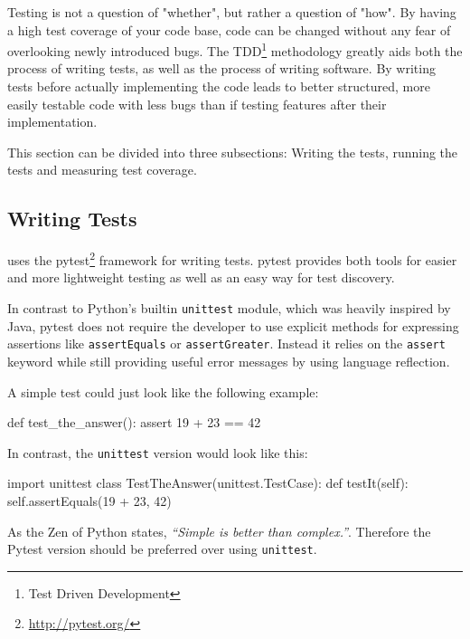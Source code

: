 \noindent Testing is not a question of "whether", but rather a question of
"how". By having a high test coverage of your code base, code can be changed
without any fear of overlooking newly introduced bugs. The TDD\footnote{Test
Driven Development} methodology greatly aids both the process of writing tests,
as well as the process of writing software. By writing tests before actually
implementing the code leads to better structured, more easily testable code with
less bugs than if testing features after their implementation.

This section can be divided into three subsections: Writing the tests, running
the tests and measuring test coverage.

\subsection{Writing Tests}

\tangible{} uses the pytest\footnote{\url{http://pytest.org/}} framework for
writing tests. pytest provides both tools for easier and more lightweight
testing as well as an easy way for test discovery.

In contrast to Python's builtin \texttt{unittest} module, which was heavily
inspired by Java, pytest does not require the developer to use explicit methods
for expressing assertions like \texttt{assertEquals} or \texttt{assertGreater}.
Instead it relies on the \texttt{assert} keyword while still providing useful
error messages by using language reflection.

A simple test could just look like the following example:

\vspace{.5\baselineskip}
\begin{pythoncode}
def test_the_answer():
    assert 19 + 23 == 42
\end{pythoncode}

\noindent In contrast, the \texttt{unittest} version would look like this:

\vspace{.5\baselineskip}
\begin{pythoncode}
import unittest
class TestTheAnswer(unittest.TestCase):
    def testIt(self):
        self.assertEquals(19 + 23, 42)
\end{pythoncode}

As the Zen of Python \cite{pep20:2004} states, \emph{``Simple is better than
complex.''}. Therefore the Pytest version should be preferred over using
\texttt{unittest}.

